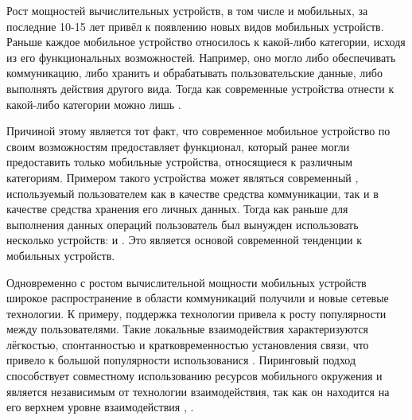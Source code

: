 %
Рост мощностей вычислительных устройств, в том числе и мобильных, за последние 10-15 лет привёл к появлению новых видов мобильных устройств.
%
Раньше каждое мобильное устройство относилось к какой-либо категории, исходя из его функциональных возможностей. Например, оно могло либо обеспечивать коммуникацию, либо хранить и обрабатывать пользовательские данные, либо выполнять действия другого вида.
%
Тогда как современные устройства отнести к какой-либо категории можно лишь .

%
Причиной этому является тот факт, что современное мобильное устройство по своим возможностям предоставляет функционал, который ранее могли предоставить только мобильные устройства, относящиеся к различным категориям.
%
Примером такого устройства может являться современный , используемый пользователем как в качестве средства коммуникации, так и в качестве средства хранения его личных данных.
%
Тогда как раньше для выполнения данных операций пользователь был вынужден использовать несколько устройств:  и . 
%
Это является основой современной тенденции к  мобильных устройств.

%
Одновременно с ростом вычислительной мощности мобильных устройств широкое распространение в области коммуникаций получили и новые сетевые технологии.
%
К примеру, поддержка технологии   привела к росту популярности  между пользователями.
%
Такие локальные взаимодействия характеризуются лёгкостью, спонтанностью и кратковременностью установления связи, что привело к большой популярности использованися  .
%
Пиринговый подход способствует совместному использованию ресурсов мобильного окружения и является независимым от технологии взаимодействия, так как он находится на его верхнем уровне взаимодействия , .

\begin{comment} %
\Paragraph{Гетерогенность мобильного пирингового окружения}
%
Стоит отметить, что следствием процесса коммуникации между различными видами мобильных устройств является повышение уровня гетерогенности мобильной коммуникационной среды.
%
Это может привести к появлению потенциальных проблем, например, к невозможности коммуникациимежду мобильными устройствами, имеющими поддержку разных сетевых технологий.
%
Но в настоящий момент проблемы такого рода решены путём универсальности мобильных устройств вцелом, в частности, поддержкой устройствами только стандартизированных сетевых технологий \WebSite{Bluetooth}, \WebSite{WiFi}.
\end{comment}

